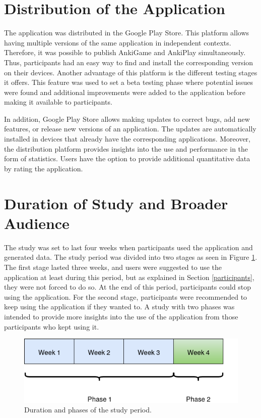 \section{Distribution of the Application}
The application was distributed in the Google Play Store. This platform allows having multiple versions of the same application in independent contexts. Therefore, it was possible to publish AnkiGame and AnkiPlay simultaneously. Thus, participants had an easy way to find and install the corresponding version on their devices. Another advantage of this platform is the different testing stages it offers. This feature was used to set a beta testing phase where potential issues were found and additional improvements were added to the application before making it available to participants.

In addition, Google Play Store allows making updates to correct bugs, add new features, or release new versions of an application. The updates are automatically installed in devices that already have the corresponding applications. Moreover, the distribution platform provides insights into the use and performance in the form of statistics. Users have the option to provide additional quantitative data by rating the application.

\section{Duration of Study and Broader Audience}
The study was set to last four weeks when participants used the application and generated data. The study period was divided into two stages as seen in Figure \ref{fig:study-period}. The first stage lasted three weeks, and users were suggested to use the application at least during this period, but as explained in Section \ref{participants}, they were not forced to do so. At the end of this period, participants could stop using the application. For the second stage, participants were recommended to keep using the application if they wanted to. A study with two phases was intended to provide more insights into the use of the application from those participants who kept using it.

\begin{figure}[htb]
    \vskip 5mm
        \begin{center}
            \includegraphics[scale=0.7]{./Figures/study_period.png}
            \caption{Duration and phases of the study period.}
            \label{fig:study-period}
        \end{center}
    \vskip -5mm
\end{figure}

